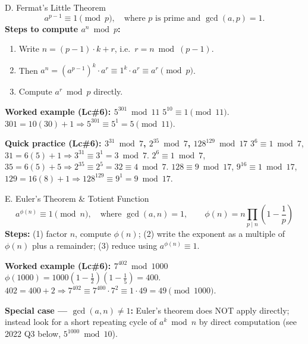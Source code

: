 \documentclass[12pt,a4paper]{article}
\begin{document}
\begin{algobox}{D. Fermat's Little Theorem}
\[
a^{p-1} \equiv 1 \pmod{p}, \quad \text{where } p \text{ is prime and } \gcd(a,p)=1.
\]
\textbf{Steps to compute $a^n \bmod p$:}
\begin{enumerate}[noitemsep]
  \item Write $n = (p-1)\cdot k + r$, i.e.\ $r = n \bmod (p-1)$.
  \item Then $a^n = (a^{p-1})^k \cdot a^r \equiv 1^k \cdot a^r \equiv a^r \pmod p$.
  \item Compute $a^r \bmod p$ directly.
\end{enumerate}

\textbf{Worked example (Lc\#6): $5^{301} \bmod 11$}
$5^{10}\equiv1\pmod{11}$. $301=10(30)+1 \Rightarrow 5^{301}\equiv5^1=\boxed{5}\pmod{11}$.

\textbf{Quick practice (Lc\#6): $3^{31}\bmod7$, $2^{35}\bmod7$, $128^{129}\bmod17$}
$3^6\equiv1\bmod7$, $31=6(5)+1\Rightarrow3^{31}\equiv3^1=\boxed{3}\bmod7$.
$2^6\equiv1\bmod7$, $35=6(5)+5\Rightarrow2^{35}\equiv2^5=32\equiv\boxed{4}\bmod7$.
$128\equiv9\bmod17$, $9^{16}\equiv1\bmod17$, $129=16(8)+1\Rightarrow128^{129}\equiv9^1=\boxed{9}\bmod17$.
\end{algobox}

\begin{algobox}{E. Euler's Theorem \& Totient Function}
\[
a^{\phi(n)} \equiv 1 \pmod{n}, \quad \text{where } \gcd(a,n)=1, \qquad \phi(n) = n\prod_{p \mid n}\left(1-\frac{1}{p}\right)
\]
\textbf{Steps:} (1) factor $n$, compute $\phi(n)$; (2) write the exponent as a multiple of $\phi(n)$ plus a remainder; (3) reduce using $a^{\phi(n)}\equiv1$.

\textbf{Worked example (Lc\#6): $7^{402} \bmod 1000$}
$\phi(1000)=1000(1-\tfrac12)(1-\tfrac15)=400$. $402=400+2 \Rightarrow 7^{402}\equiv7^{400}\cdot7^2\equiv1\cdot49=\boxed{49}\pmod{1000}$.

\textbf{Special case --- $\gcd(a,n)\neq1$:} Euler's theorem does NOT apply directly; instead look for a short repeating cycle of $a^k \bmod n$ by direct computation (see 2022 Q3 below, $5^{1000}\bmod10$).
\end{algobox}
\end{document}
